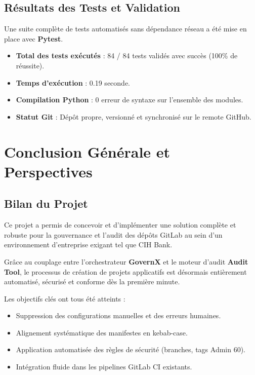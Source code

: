 \documentclass[12pt,a4paper]{report}
\begin{document}
\section{Résultats des Tests et Validation}
Une suite complète de tests automatisés sans dépendance réseau a été mise en place avec \textbf{Pytest}.

\begin{warnBox}
\begin{itemize}
    \item \textbf{Total des tests exécutés} : 84 / 84 tests validés avec succès (100\% de réussite).
    \item \textbf{Temps d'exécution} : 0.19 seconde.
    \item \textbf{Compilation Python} : 0 erreur de syntaxe sur l'ensemble des modules.
    \item \textbf{Statut Git} : Dépôt propre, versionné et synchronisé sur le remote GitHub.
\end{itemize}
\end{warnBox}

\chapter*{Conclusion Générale et Perspectives}

\section*{Bilan du Projet}
Ce projet a permis de concevoir et d'implémenter une solution complète et robuste pour la gouvernance et l'audit des dépôts GitLab au sein d'un environnement d'entreprise exigant tel que CIH Bank.

Grâce au couplage entre l'orchestrateur \textbf{GovernX} et le moteur d'audit \textbf{Audit Tool}, le processus de création de projets applicatifs est désormais entièrement automatisé, sécurisé et conforme dès la première minute.

Les objectifs clés ont tous été atteints :
\begin{itemize}
    \item Suppression des configurations manuelles et des erreurs humaines.
    \item Alignement systématique des manifestes en kebab-case.
    \item Application automatisée des règles de sécurité (branches, tags Admin 60).
    \item Intégration fluide dans les pipelines GitLab CI existants.
\end{itemize}
\end{document}
